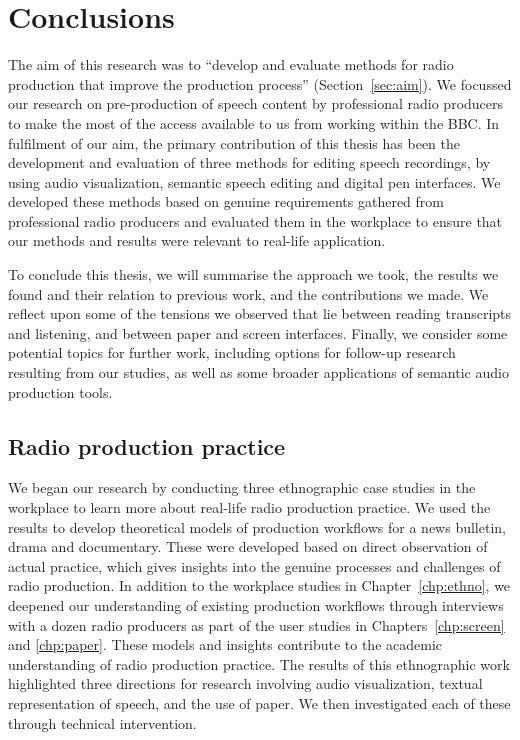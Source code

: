 \chapter{Conclusions}\label{chp:conclusions}

The aim of this research was to ``develop and evaluate methods for radio production that improve the production
process'' (Section~\ref{sec:aim}).  We focussed our research on pre-production of speech content by professional radio
producers to make the most of the access available to us from working within the BBC.  In fulfilment of our aim, the
primary contribution of this thesis has been the development and evaluation of three methods for editing speech
recordings, by using audio visualization, semantic speech editing and digital pen interfaces.  We developed these
methods based on genuine requirements gathered from professional radio producers and evaluated them in the workplace to
ensure that our methods and results were relevant to real-life application.

To conclude this thesis, we will summarise the approach we took, the results we found and their relation to previous
work, and the contributions we made.  We reflect upon some of the tensions we observed that lie between reading
transcripts and listening, and between paper and screen interfaces.  Finally, we consider some potential topics for
further work, including options for follow-up research resulting from our studies, as well as some broader applications
of semantic audio production tools.

\section{Radio production practice}

We began our research by conducting three ethnographic case studies in the workplace to learn more about real-life
radio production practice.  We used the results to develop theoretical models of production workflows for a news
bulletin, drama and documentary.  These were developed based on direct observation of actual practice, which gives
insights into the genuine processes and challenges of radio production.  In addition to the workplace studies in
Chapter~\ref{chp:ethno}, we deepened our understanding of existing production workflows through interviews with a dozen
radio producers as part of the user studies in Chapters~\ref{chp:screen} and \ref{chp:paper}.  These models and
insights contribute to the academic understanding of radio production practice.  The results of this ethnographic work
highlighted three directions for research involving audio visualization, textual representation of speech, and the use
of paper.  We then investigated each of these through technical intervention.

